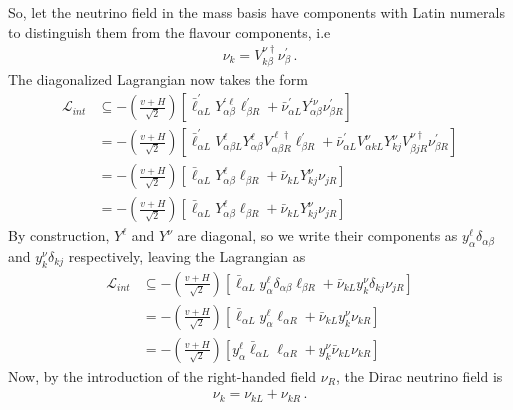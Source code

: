 So, let the neutrino field in the mass basis have components with Latin numerals to distinguish them from the flavour components, i.e 
\begin{align}\label{eq:nu_rotation} 
    \nu_{k} =  V_{k\beta}^{\nu \dagger} \nu_{\beta}^\prime\,.
\end{align}
The diagonalized Lagrangian now takes the form 
\begin{align}
    \mathcal{L}_{int} &\subseteq -\left( \frac{v + H}{\sqrt{2}} \right) \left[\bar{\ell}_{\alpha L}^{\prime} Y_{\alpha \beta}^{\prime \ell} \ell_{\beta R}^{\prime} + \bar{\nu}_{\alpha L}^{\prime} Y_{\alpha \beta}^{\prime \nu} \nu_{\beta R}^{\prime}\right] \nonumber \\
    &= -\left( \frac{v + H}{\sqrt{2}} \right) \left[\bar{\ell}_{\alpha L}^{\prime} V_{\alpha \beta L}^{\ell} Y_{\alpha \beta}^{ \ell} V_{\alpha \beta R}^{\ell \dagger} \ell_{\beta R}^{\prime}
    + \bar{\nu}_{\alpha L}^{\prime} V_{\alpha k L}^{\nu} Y_{kj}^{\nu} V_{\beta j  R}^{\nu \dagger} \nu_{\beta R}^{\prime}\right] \nonumber \\
    &= -\left( \frac{v + H}{\sqrt{2}} \right) \left[\bar{\ell}_{\alpha L} Y_{\alpha \beta}^{ \ell} \ell_{\beta R} + \bar{\nu}_{k L} Y_{kj}^{ \nu} \nu_{j R}\right] \nonumber \\
    &= -\left( \frac{v + H}{\sqrt{2}} \right) \left[\bar{\ell}_{\alpha L} Y_{\alpha \beta}^{ \ell} \ell_{\beta R} + \bar{\nu}_{k L} Y_{kj}^\nu \nu_{j R}\right]
\end{align}
By construction, $Y^\ell$ and $Y^\nu$ are diagonal, so we write their components as $y_{\alpha}^{\ell} \delta_{\alpha \beta}$ and $y_{k}^{\nu} \delta_{k j}$ respectively, leaving the Lagrangian as 
\begin{align}\label{eq:L_H}
    \mathcal{L}_{int} 
    &\subseteq-\left( \frac{v + H}{\sqrt{2}} \right) \left[\bar{\ell}_{\alpha L} y_{\alpha}^{\ell} \delta_{\alpha \beta} \ell_{\beta R} + \bar{\nu}_{k L} y_{k}^{\nu} \delta_{k j} \nu_{j R}\right] \nonumber \\
    &=-\left( \frac{v + H}{\sqrt{2}} \right) \left[\bar{\ell}_{\alpha L} y_{\alpha}^{\ell}  \ell_{\alpha R} + \bar{\nu}_{k L} y_{k}^{\nu} \nu_{k R}\right] \nonumber \\
    &=-\left( \frac{v + H}{\sqrt{2}} \right) \left[ y_{\alpha}^{\ell}  \bar{\ell}_{\alpha L}\ell_{\alpha R} +  y_{k}^{\nu}\bar{\nu}_{k L} \nu_{k R}\right] 
\end{align}
Now, by the introduction of the right-handed field $\nu_R$, the Dirac neutrino field is
\begin{align}
    \nu_k = \nu_{kL} + \nu_{kR}\,.
\end{align}
